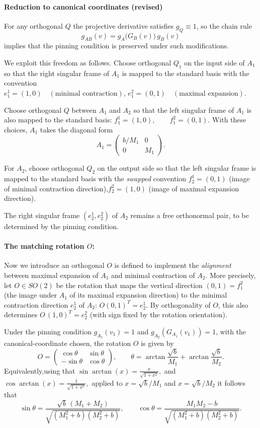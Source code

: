 \documentclass[a4paper,11pt]{article}
\theoremstyle{definition}
\begin{document}
\paragraph{Reduction to canonical coordinates (revised)}


For any orthogonal $Q$ the projective derivative satisfies $g_Q \equiv 1$, so the chain rule
\[
g_{AB}(v) = g_A\bigl(G_B(v)\bigr)\, g_B(v)
\]
implies that the pinning condition is preserved under such modifications.

We exploit this freedom as follows. Choose orthogonal $Q_1$ on the input side of $A_1$ so that the right singular frame of $A_1$ is mapped to the standard basis with the convention $
e^1_1 = (1,0) \quad (\text{minimal contraction}), \, e^2_1 = (0,1) \quad (\text{maximal expansion}).$

Choose orthogonal $Q$ between $A_1$ and $A_2$ so that the left singular frame of $A_1$ is also mapped to the standard basis: $
f^1_1 = (1,0), \qquad f^2_1 = (0,1).$ 
With these choices, $A_1$ takes the diagonal form
\[
A_1 = \begin{pmatrix} b/M_1 & 0 \\ 0 & M_1 \end{pmatrix}.
\]

For $A_2$, choose orthogonal $Q_2$ on the output side so that the left singular frame is mapped to the standard basis with the \emph{swapped} convention
$f^1_2 = (0,1)$ (image of minimal contraction direction),$f^2_2 = (1,0)$ (image of maximal expansion direction).

The right singular frame $(e^1_2, e^2_2)$ of $A_2$ remains a free orthonormal pair, to be determined by the pinning condition.


\paragraph{The matching rotation $O$:} Now we introduce an  orthogonal $O$ is defined to implement the {\it alignment} between maximal expansion of $A_1$ and minimal contraction of $A_2$.  More precisely, let $O \in SO(2)$ be the rotation that maps the vertical direction $(0,1) = f^2_1$ (the image under $A_1$ of its maximal expansion direction) to the minimal contraction direction $e^1_2$ of $A_2$: $ O(0,1)^T = e^1_2.$ By orthogonality of $O$, this also determines $O\,(1,0)^T = e^2_2$ (with sign fixed by the rotation orientation).

Under the pinning condition $g_{A_1}(v_1) = 1$ and $g_{A_2}(G_{A_1}(v_1)) = 1$, with the canonical-coordinate chosen, the rotation $O$ is given by
\[
O = \begin{pmatrix} \cos\theta & \sin\theta \\ -\sin\theta & \cos\theta \end{pmatrix},
\qquad
\theta = \arctan\!\frac{\sqrt{b}}{M_1} + \arctan\!\frac{\sqrt{b}}{M_2}.
\]
Equivalently,using that $\sin\arctan(x) = \frac{x}{\sqrt{1+x^2}},$ and $ \cos\arctan(x) = \frac{1}{\sqrt{1+x^2}},$ applied to  $x = \sqrt b/M_1$ and $x = \sqrt b/M_2$ it follows that 
\[
\sin\theta = \frac{\sqrt{b}\,(M_1 + M_2)}{\sqrt{(M_1^2 + b)(M_2^2 + b)}},
\qquad
\cos\theta = \frac{M_1 M_2 - b}{\sqrt{(M_1^2 + b)(M_2^2 + b)}}.
\]
\end{document}
